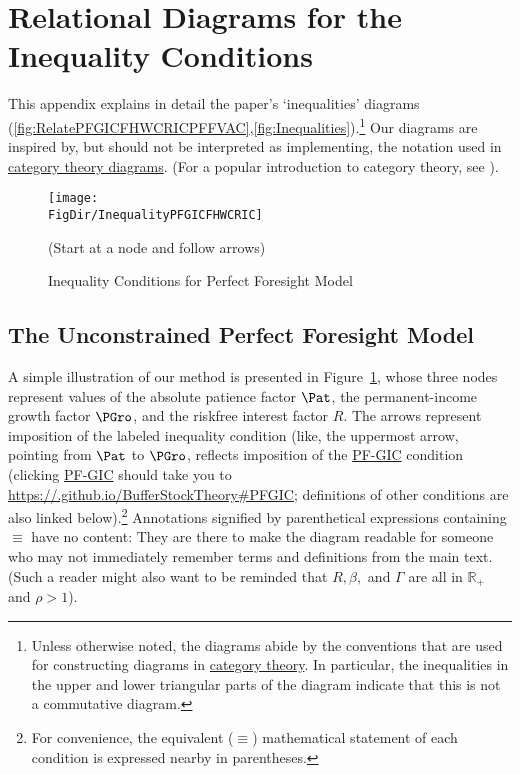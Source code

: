 \documentclass[\econtexRoot/BufferStockTheory]{subfiles}
\newcommand{\BSTlinkTo}{https://\owner.github.io/BufferStockTheory}
\newcommand{\PFGICFull}{\href{{\BSTlinkTo}\#PFGIC}{{\BSTlinkTo}\#PFGIC}}
\renewcommand{\PFGIC}{\href{{\BSTlinkTo}\#PFGIC}{\textrm{PF-GIC}}}
\begin{document}
\label{sec:ApndxConditionDiagrams}
\hypertarget{ApndxConditionDiagrams}{}
\section{Relational Diagrams for the Inequality Conditions}\label{sec:ApndxConditionDiagrams}

This appendix explains in detail the paper's `inequalities' diagrams (\ref{fig:RelatePFGICFHWCRICPFFVAC},\ref{fig:Inequalities}).\footnote{Unless otherwise noted, the diagrams abide by the conventions that are used for constructing diagrams in \href{https://en.wikipedia.org/wiki/Diagram_(category_theory)}{category theory}.  In particular, the inequalities in the upper and lower triangular parts of the diagram indicate that this is not a commutative diagram.}  Our diagrams are inspired by, but should not be interpreted as implementing, the notation used in \href{https://en.wikipedia.org/wiki/Diagram_(category_theory)}{category theory diagrams}.  (For a popular introduction to category theory, see \cite{riehl2017category}).

\hypertarget{InequalityPFGICFHWCRIC}{}
\begin{figure}
\centering
\texttt{[image: \\FigDir/InequalityPFGICFHWCRIC]}
\caption{Inequality Conditions for Perfect Foresight Model}
\centerline{ (Start at a node and follow arrows)}
\label{fig:InequalityPFGICFHWCRIC}
\end{figure}

\subsection{The Unconstrained Perfect Foresight Model}

A simple illustration of our method is presented in Figure~\ref{fig:InequalityPFGICFHWCRIC}, whose three nodes represent values of the absolute patience factor $\Pat$, the permanent-income growth factor $\PGro$, and the riskfree interest factor ${R}$.  The arrows represent imposition of the labeled inequality condition  (like,  the uppermost arrow, pointing from {$\Pat$} to $\PGro$, reflects imposition of the {\PFGIC} condition (clicking {\PFGIC} should take you to {\PFGICFull}; definitions of other conditions are also linked below).\footnote{For convenience, the equivalent ($\equiv$) mathematical statement of each condition is expressed nearby in parentheses.}  Annotations signified by parenthetical expressions containing $\equiv$ have no content: They are there to make the diagram readable for someone who may not immediately remember terms and definitions from the main text.  (Such a reader might also want to be reminded that ${R}, {\beta}, $ and $\Gamma$ are all in $\mathbb{R}_{+}$ and ${\rho}>1$).
\end{document}
